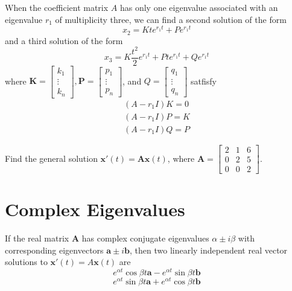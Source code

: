 \documentclass[../diffeq.tex]{subfiles}
\begin{document}
When the coefficient matrix $A$ has only one eigenvalue associated with an eigenvalue $r_1$ of multiplicity three, we can find a second solution of the form 
\[ x_2 = Kte^{r_1t}+Pe^{r_1t} \]
and a third solution of the form 
\[ x_3 = K\frac{t^2}{2}e^{r_1t}+Pte^{r_1t}+Qe^{r_1t} \]
where $\textbf{K}=\begin{bmatrix}
    k_1 \\ \vdots \\ k_n
\end{bmatrix}, \textbf{P}=\begin{bmatrix}
    p_1 \\ \vdots \\ p_n
\end{bmatrix}$, and $Q=\begin{bmatrix}
    q_1 \\ \vdots \\ q_n
\end{bmatrix}$ satfisfy 
\begin{align*}
    (A-r_1I)K=0\\
    (A-r_1I)P=K\\
    (A-r_1I)Q=P
\end{align*}

\ex Find the general solution $\textbf{x}'(t)=\textbf{Ax}(t)$, where $\textbf{A}=\begin{bmatrix}
    2 & 1 & 6\\
    0 & 2 & 5\\
    0 & 0 & 2
\end{bmatrix}$.

\section{Complex Eigenvalues}
If the real matrix $\textbf{A}$ has complex conjugate eigenvalues $\alpha \pm i\beta$ with corresponding eigenvectors $\textbf{a}\pm i\textbf{b}$, then two linearly independent real vector solutions to 
$\textbf{x}'(t)=A\textbf{x}(t)$ are 
\[ e^{\alpha t}\cos \beta t \textbf{a}-e^{\alpha t}\sin \beta t \textbf{b} \]
\[ e^{\alpha t}\sin \beta t \textbf{a}+e^{\alpha t}\cos \beta t \textbf{b} \]
\end{document}
